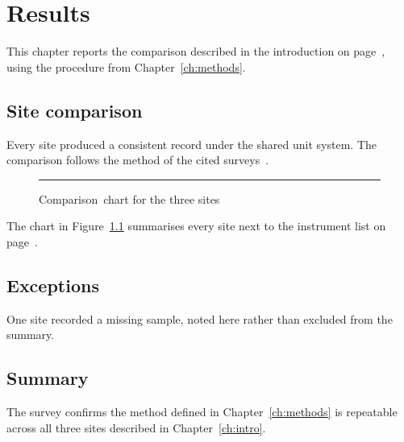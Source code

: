 \chapter{Results}\label{ch:results}
This chapter reports the comparison described in the introduction on
page~\pageref{sec:scope}, using the procedure from
Chapter~\ref{ch:methods}.

\section{Site comparison}\label{sec:comparison}
Every site produced a consistent record under the shared unit system.
The comparison follows the method of the cited surveys~\cite{smith2020,doe2021}.

\begin{figure}[ht!]
  \rule{3cm}{3cm}
  \caption{Comparison~chart for the three sites}
  \label{fig:comparison}
\end{figure}

The chart in Figure~\ref{fig:comparison} summarises every site next
to the instrument list on page~\pageref{tab:instruments}.

\section{Exceptions}\label{sec:exceptions}
One site recorded a missing sample, noted here rather than excluded
from the summary.

\section{Summary}\label{sec:summary}
The survey confirms the method defined in Chapter~\ref{ch:methods} is
repeatable across all three sites described in
Chapter~\ref{ch:intro}.
